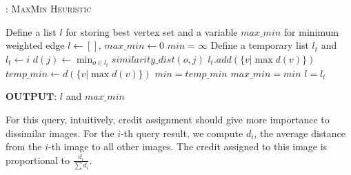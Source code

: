 \begin{algorithm}[H]
\caption{: \textsc{MaxMin Heuristic}} \label{alg:mst}
\begin{small}
\begin{algorithmic}[1]
\STATE Define a list $l$ for storing best vertex set and a variable $max\_min$ for minimum weighted edge
\STATE $l\leftarrow []$, $max\_min \leftarrow 0$
		\STATE $min=\infty$
        \STATE Define a temporary list $l_t$ and $l_t \leftarrow i$
                \STATE $d(j) \leftarrow \min_{o \in l_t} similarity\_dist(o,j)$
            \ENDFOR
                \STATE $l_t.add(\{v | \max {d(v)}\})$
                \STATE  $temp\_min\leftarrow d(\{v | \max {d(v)}\})$  
            \ENDIF
            \STATE $min = temp\_min$
        \ENDIF
        \ENDWHILE
        		\STATE $max\_min=min$
        		\STATE $l=l_t$
        \ENDIF
\ENDFOR
\end{algorithmic}
\end{small}
$\textbf{OUTPUT}$: $l$ and $max\_min$
\end{algorithm}



For this query, intuitively, credit assignment should give more
importance to dissimilar images.
%
For the $i$-th query result, we compute $d_i$, the average distance from
the $i$-th image to all other images.
%
The credit assigned to this image is proportional to
$\frac{d_i}{\sum{d_i}}$.

